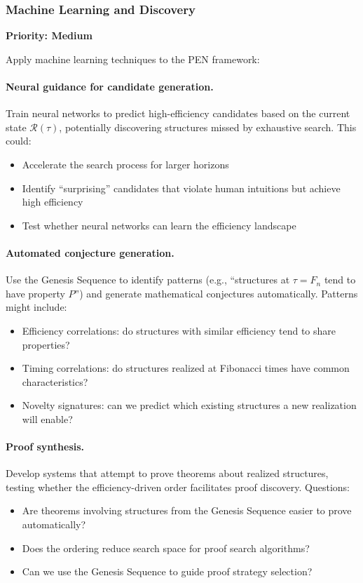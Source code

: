 \documentclass[11pt]{article}
\theoremstyle{definition}
\theoremstyle{remark}
\begin{document}
\subsubsection{Machine Learning and Discovery}

\textbf{Priority: Medium}

Apply machine learning techniques to the PEN framework:

\paragraph{Neural guidance for candidate generation.}
Train neural networks to predict high-efficiency candidates based on the current state $\mathcal{R}(\tau)$,
potentially discovering structures missed by exhaustive search. This could:
\begin{itemize}
\item Accelerate the search process for larger horizons
\item Identify ``surprising'' candidates that violate human intuitions but achieve high efficiency
\item Test whether neural networks can learn the efficiency landscape
\end{itemize}

\paragraph{Automated conjecture generation.}
Use the Genesis Sequence to identify patterns (e.g., ``structures at $\tau = F_n$ tend to have property $P$'')
and generate mathematical conjectures automatically. Patterns might include:
\begin{itemize}
\item Efficiency correlations: do structures with similar efficiency tend to share properties?
\item Timing correlations: do structures realized at Fibonacci times have common characteristics?
\item Novelty signatures: can we predict which existing structures a new realization will enable?
\end{itemize}

\paragraph{Proof synthesis.}
Develop systems that attempt to prove theorems about realized structures, testing whether the
efficiency-driven order facilitates proof discovery. Questions:
\begin{itemize}
\item Are theorems involving structures from the Genesis Sequence easier to prove automatically?
\item Does the ordering reduce search space for proof search algorithms?
\item Can we use the Genesis Sequence to guide proof strategy selection?
\end{itemize}
\end{document}
